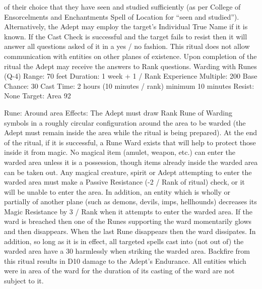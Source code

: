\documentclass[a4paper]{article}
\begin{document}
\begin{multicols}{3}
of their choice that they have seen and studied
sufficiently (as per College of Ensorcelments and
Enchantments Spell of Location for “seen and
studied”). Alternatively, the Adept may employ the
target’s Individual True Name if it is known.
If the Cast Check is successful and the target fails
to resist then it will answer all questions asked of it
in a yes / no fashion. This ritual does not allow
communication with entities on other planes of
existence. Upon completion of the ritual the Adept
may receive the answers to Rank questions.
Warding with Runes (Q-4)
Range: 70 feet
Duration: 1 week + 1 / Rank
Experience Multiple: 200
Base Chance: 30%
Cast Time: 2 hours (10 minutes / rank) minimum
10 minutes
Resist: None
Target: Area
92

Rune: Around area
Effects: The Adept must draw Rank Rune of Warding symbols in a roughly circular configuration
around the area to be warded (the Adept must
remain inside the area while the ritual is being
prepared). At the end of the ritual, if it is successful, a Rune Ward exists that will help to protect
those inside it from magic.
No magical item (amulet, weapon, etc.) can enter
the warded area unless it is a possession, though
items already inside the warded area can be taken
out.
Any magical creature, spirit or Adept attempting to
enter the warded area must make a Passive Resistance (-2 / Rank of ritual) check, or it will be unable to enter the area. In addition, an entity which
is wholly or partially of another plane (such as
demons, devils, imps, hellhounds) decreases its
Magic Resistance by 3 / Rank when it attempts to
enter the warded area.
If the ward is breached then one of the Runes supporting the ward momentarily glows and then
disappears. When the last Rune disappears then the
ward dissipates.
In addition, so long as it is in effect, all targeted
spells cast into (not out of) the warded area have a
30%
harmlessly when striking the warded area.
Backfire from this ritual results in D10 damage to
the Adept’s Endurance.
All entities which were in area of the ward for the
duration of its casting of the ward are not subject to
it.


\end{multicols}
\end{document}
